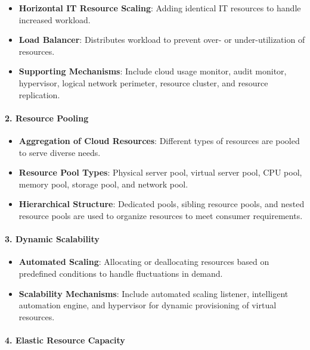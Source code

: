\documentclass[10pt, landscape]{article}
\begin{document}
\begin{multicols*}{4}
\begin{itemize}
\tightlist
\item
  \textbf{Horizontal IT Resource Scaling}: Adding identical IT resources
  to handle increased workload.
\item
  \textbf{Load Balancer}: Distributes workload to prevent over- or
  under-utilization of resources.
\item
  \textbf{Supporting Mechanisms}: Include cloud usage monitor, audit
  monitor, hypervisor, logical network perimeter, resource cluster, and
  resource replication.
\end{itemize}

\paragraph{2. Resource Pooling}\label{resource-pooling}

\begin{itemize}
\tightlist
\item
  \textbf{Aggregation of Cloud Resources}: Different types of resources
  are pooled to serve diverse needs.
\item
  \textbf{Resource Pool Types}: Physical server pool, virtual server
  pool, CPU pool, memory pool, storage pool, and network pool.
\item
  \textbf{Hierarchical Structure}: Dedicated pools, sibling resource
  pools, and nested resource pools are used to organize resources to
  meet consumer requirements.
\end{itemize}

\paragraph{3. Dynamic Scalability}\label{dynamic-scalability}

\begin{itemize}
\tightlist
\item
  \textbf{Automated Scaling}: Allocating or deallocating resources based
  on predefined conditions to handle fluctuations in demand.
\item
  \textbf{Scalability Mechanisms}: Include automated scaling listener,
  intelligent automation engine, and hypervisor for dynamic provisioning
  of virtual resources.
\end{itemize}

\paragraph{4. Elastic Resource
Capacity}\label{elastic-resource-capacity}


\end{multicols*}
\end{document}
